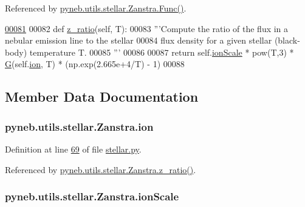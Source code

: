 Referenced by \hyperlink{stellar_8py_source_l00089}{pyneb.\-utils.\-stellar.\-Zanstra.\-Func()}.


\begin{DoxyCode}
\hypertarget{classpyneb_1_1utils_1_1stellar_1_1_zanstra_l00081}{}\hyperlink{classpyneb_1_1utils_1_1stellar_1_1_zanstra_a33d4960cdb38f6a25972f20da8d146d1}{00081} 
00082     \textcolor{keyword}{def }\hyperlink{classpyneb_1_1utils_1_1stellar_1_1_zanstra_a33d4960cdb38f6a25972f20da8d146d1}{z\_ratio}(self, T):
00083         \textcolor{stringliteral}{'''Compute the ratio of the flux in a nebular emission line to the stellar }
00084 \textcolor{stringliteral}{           flux density for a given stellar (black-body) temperature T.}
00085 \textcolor{stringliteral}{        '''}
00086 
00087         \textcolor{keywordflow}{return} self.\hyperlink{classpyneb_1_1utils_1_1stellar_1_1_zanstra_a8f04a2133b2acf4641a2ce08db7fc100}{ionScale} * pow(T,3) * \hyperlink{namespacepyneb_1_1utils_1_1stellar_ab168636a519c17879ce58df1188ddbe1}{G}(self.\hyperlink{classpyneb_1_1utils_1_1stellar_1_1_zanstra_a48c1797d46d49841c8b3a9275679e3ae}{ion}, T) * (np.exp(2.665e+4/T) - 1)
00088 

\end{DoxyCode}


\subsection{Member Data Documentation}
\hypertarget{classpyneb_1_1utils_1_1stellar_1_1_zanstra_a48c1797d46d49841c8b3a9275679e3ae}{
\subsubsection[{ion}]{\setlength{\rightskip}{0pt plus 5cm}pyneb.\-utils.\-stellar.\-Zanstra.\-ion}}\label{classpyneb_1_1utils_1_1stellar_1_1_zanstra_a48c1797d46d49841c8b3a9275679e3ae}


Definition at line \hyperlink{stellar_8py_source_l00069}{69} of file \hyperlink{stellar_8py_source}{stellar.\-py}.



Referenced by \hyperlink{stellar_8py_source_l00081}{pyneb.\-utils.\-stellar.\-Zanstra.\-z\-\_\-ratio()}.

\hypertarget{classpyneb_1_1utils_1_1stellar_1_1_zanstra_a8f04a2133b2acf4641a2ce08db7fc100}{
\subsubsection[{ion\-Scale}]{\setlength{\rightskip}{0pt plus 5cm}pyneb.\-utils.\-stellar.\-Zanstra.\-ion\-Scale}}\label{classpyneb_1_1utils_1_1stellar_1_1_zanstra_a8f04a2133b2acf4641a2ce08db7fc100}


